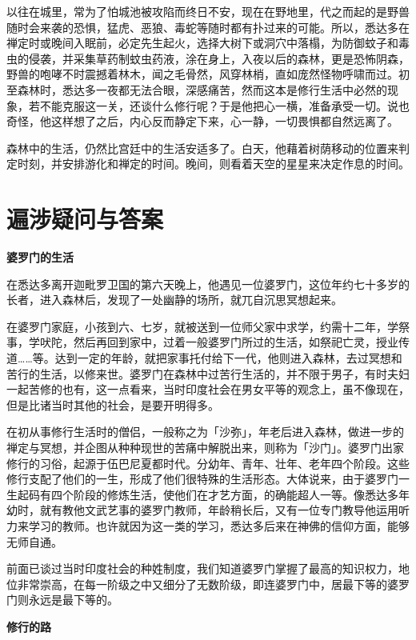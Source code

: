 \documentclass[twoside,openany]{book}
\newcommand{\mt}[1]{\textbullet \textbf{#1}}
\begin{document}
以往在城里，常为了怕城池被攻陷而终日不安，现在在野地里，代之而起的是野兽随时会来袭的恐惧，猛虎、恶狼、毒蛇等随时都有扑过来的可能。所以，悉达多在禅定时或晚间入眠前，必定先生起火，选择大树下或洞穴中落榻，为防御蚊子和毒虫的侵袭，并采集草药制蚊虫药液，涂在身上，入夜以后的森林，更是恐怖阴森，野兽的咆哮不时震撼着林木，闻之毛骨然，风穿林梢，直如庞然怪物呼啸而过。初至森林时，悉达多一夜都无法合眼，深感痛苦，然而这本是修行生活中必然的现象，若不能克服这一关，还谈什么修行呢？于是他把心一横，准备承受一切。说也奇怪，他这样想了之后，内心反而静定下来，心一静，一切畏惧都自然远离了。

森林中的生活，仍然比宫廷中的生活安适多了。白天，他藉着树荫移动的位置来判定时刻，并安排游化和禅定的时间。晚间，则看着天空的星星来决定作息的时间。



\section{遍涉疑问与答案}\label{sec1.6}

\mt{婆罗门的生活}

在悉达多离开迦毗罗卫国的第六天晚上，他遇见一位婆罗门，这位年约七十多岁的长者，进入森林后，发现了一处幽静的场所，就兀自沉思冥想起来。

在婆罗门家庭，小孩到六、七岁，就被送到一位师父家中求学，约需十二年，学祭事，学吠陀，然后再回到家中，过着一般婆罗门所过的生活，如祭祀亡灵，授业传道……等。达到一定的年龄，就把家事托付给下一代，他则进入森林，去过冥想和苦行的生活，以修来世。婆罗门在森林中过苦行生活的，并不限于男子，有时夫妇一起苦修的也有，这一点看来，当时印度社会在男女平等的观念上，虽不像现在，但是比诸当时其他的社会，是要开明得多。

在初从事修行生活时的僧侣，一般称之为「沙弥」，年老后进入森林，做进一步的禅定与冥想，并企图从种种现世的苦痛中解脱出来，则称为「沙门」。婆罗门出家修行的习俗，起源于伍巴尼夏都时代。分幼年、青年、壮年、老年四个阶段。这些修行支配了他们的一生，形成了他们很特殊的生活形态。大体说来，由于婆罗门一生起码有四个阶段的修炼生活，使他们在才艺方面，的确能超人一等。像悉达多年幼时，就有教他文武艺事的婆罗门教师，年龄稍长后，又有一位专门教导他运用听力来学习的教师。也许就因为这一类的学习，悉达多后来在神佛的信仰方面，能够无师自通。

前面已谈过当时印度社会的种姓制度，我们知道婆罗门掌握了最高的知识权力，地位非常崇高，在每一阶级之中又细分了无数阶级，即连婆罗门中，居最下等的婆罗门则永远是最下等的。

\mt{修行的路}
\end{document}
